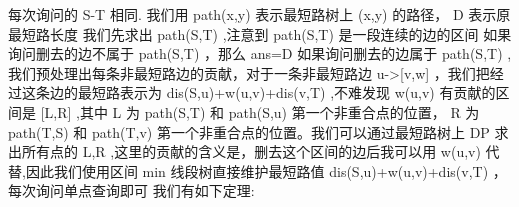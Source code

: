 {}每次询问的\markdownRendererDollarSign{} S-T \markdownRendererDollarSign{}相同.\markdownRendererParagraphSeparator
{}我们用\markdownRendererDollarSign{} path(x,y) \markdownRendererDollarSign{}表示最短路树上\markdownRendererDollarSign{} (x,y) \markdownRendererDollarSign{}的路径，\markdownRendererDollarSign{} D \markdownRendererDollarSign{}表示原最短路长度\markdownRendererParagraphSeparator
{}我们先求出\markdownRendererDollarSign{} path(S,T) \markdownRendererDollarSign{},注意到\markdownRendererDollarSign{} path(S,T) \markdownRendererDollarSign{}是一段连续的边的区间\markdownRendererParagraphSeparator
{}如果询问删去的边不属于\markdownRendererDollarSign{} path(S,T) \markdownRendererDollarSign{}，那么\markdownRendererDollarSign{} ans=D \markdownRendererDollarSign{}\markdownRendererParagraphSeparator
{}如果询问删去的边属于\markdownRendererDollarSign{} path(S,T) \markdownRendererDollarSign{},我们预处理出每条非最短路边的贡献，对于一条非最短路边\markdownRendererDollarSign{} u->[v,w] \markdownRendererDollarSign{}，我们把经过这条边的最短路表示为\markdownRendererDollarSign{} dis(S,u)+w(u,v)+dis(v,T) \markdownRendererDollarSign{},不难发现\markdownRendererDollarSign{} w(u,v) \markdownRendererDollarSign{}有贡献的区间是\markdownRendererDollarSign{} [L,R] \markdownRendererDollarSign{},其中\markdownRendererDollarSign{} L \markdownRendererDollarSign{}为\markdownRendererDollarSign{} path(S,T) \markdownRendererDollarSign{}和\markdownRendererDollarSign{} path(S,u) \markdownRendererDollarSign{}第一个非重合点的位置，\markdownRendererDollarSign{} R \markdownRendererDollarSign{}为\markdownRendererDollarSign{} path(T,S) \markdownRendererDollarSign{}和\markdownRendererDollarSign{} path(T,v) \markdownRendererDollarSign{}第一个非重合点的位置。我们可以通过最短路树上\markdownRendererDollarSign{} DP \markdownRendererDollarSign{}求出所有点的\markdownRendererDollarSign{} L,R \markdownRendererDollarSign{},这里的贡献的含义是，删去这个区间的边后我可以用\markdownRendererDollarSign{} w(u,v) \markdownRendererDollarSign{}代替,因此我们使用区间\markdownRendererDollarSign{} min \markdownRendererDollarSign{}线段树直接维护最短路值\markdownRendererDollarSign{} dis(S,u)+w(u,v)+dis(v,T) \markdownRendererDollarSign{}，每次询问单点查询即可\markdownRendererInterblockSeparator
{}\markdownRendererInterblockSeparator
{}
\markdownRendererSectionEnd \markdownRendererSectionBegin
{}\markdownRendererInterblockSeparator
{}我们有如下定理:\markdownRendererParagraphSeparator
